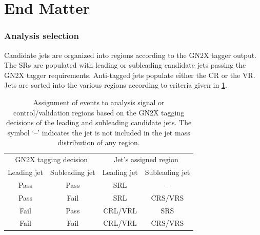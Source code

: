 \documentclass[PAPER, cernpreprint=true, atlasdraft=false, UKenglish, texmf, orcidlogo]{atlasdoc}
\begin{document}
\clearpage
\appendix
\part*{End Matter}




\section{Analysis selection}

Candidate jets are organized into regions according to the GN2X tagger output. The SRs are populated with leading or subleading candidate jets passing the GN2X tagger requirements. Anti-tagged jets populate either the CR or the VR. Jets are sorted into the various regions according to criteria given in \cref{tab:jetsorting}.

\begin{table}[h]
\centering
\caption{Assignment of events to analysis signal or control/validation regions based on the GN2X tagging decisions of the leading and subleading candidate jets. The symbol `--' indicates the jet is not included in the jet mass distribution of any region.}
\begin{tabular}{cc|cc}
\multicolumn{2}{c|}{GN2X tagging decision} & \multicolumn{2}{c}{Jet's assigned region} \\
Leading jet & Subleading jet & Leading jet & Subleading jet \\
\hline
Pass  & Pass & SRL &  -- \\
Pass  & Fail & SRL & CRS/VRS \\
Fail  & Pass & CRL/VRL & SRS \\
Fail  & Fail & CRL/VRL & CRS/VRS \\
\end{tabular}
\label{tab:jetsorting}
\end{table}
\end{document}
